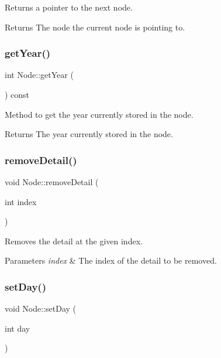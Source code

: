 Returns a pointer to the next node. 

\begin{DoxyReturn}{Returns}
The node the current node is pointing to. 
\end{DoxyReturn}
\hypertarget{class_node_a6d491d341577e676e56b4b0201844b4f}{}\label{class_node_a6d491d341577e676e56b4b0201844b4f} 
\subsubsection{\texorpdfstring{get\+Year()}{getYear()}}
{\footnotesize\ttfamily int Node\+::get\+Year (\begin{DoxyParamCaption}{ }\end{DoxyParamCaption}) const}



Method to get the year currently stored in the node. 

\begin{DoxyReturn}{Returns}
The year currently stored in the node. 
\end{DoxyReturn}
\hypertarget{class_node_a1f233dbcd9ecd73c194b4e629ff08564}{}\label{class_node_a1f233dbcd9ecd73c194b4e629ff08564} 
\subsubsection{\texorpdfstring{remove\+Detail()}{removeDetail()}}
{\footnotesize\ttfamily void Node\+::remove\+Detail (\begin{DoxyParamCaption}\item[{int}]{index }\end{DoxyParamCaption})}



Removes the detail at the given index. 


\begin{DoxyParams}{Parameters}
{\em index} & The index of the detail to be removed. \\
\hline
\end{DoxyParams}
\hypertarget{class_node_aa6c9c8301e00180ae43100eb9c1ac458}{}\label{class_node_aa6c9c8301e00180ae43100eb9c1ac458} 
\subsubsection{\texorpdfstring{set\+Day()}{setDay()}}
{\footnotesize\ttfamily void Node\+::set\+Day (\begin{DoxyParamCaption}\item[{int}]{day }\end{DoxyParamCaption})}



